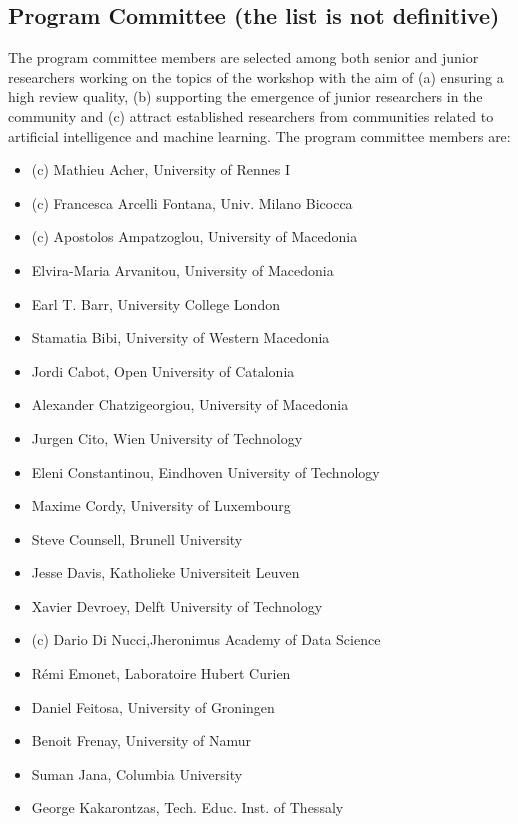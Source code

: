 \subsection{Program Committee (the list is not definitive)}
The program committee members are selected among both senior and junior researchers working on the topics of the workshop with the aim of (a) ensuring a high review quality, (b) supporting the emergence of junior researchers in the community and (c) attract established researchers from communities related to artificial intelligence and machine learning.
The program committee members are:
\begin{itemize}
	\item (c) Mathieu Acher, University of Rennes I
	\item (c) Francesca Arcelli Fontana, Univ. Milano Bicocca
	\item (c) Apostolos Ampatzoglou, University of Macedonia
	\item Elvira-Maria Arvanitou, University of Macedonia
	\item Earl T. Barr, University College London
	\item Stamatia Bibi, University of Western Macedonia
	\item Jordi Cabot, Open University of Catalonia
	\item Alexander Chatzigeorgiou, University of Macedonia
	\item Jurgen Cito, Wien University of Technology
	\item Eleni Constantinou, Eindhoven University of Technology 
	\item Maxime Cordy, University of Luxembourg
	\item Steve Counsell, Brunell University
	\item Jesse Davis, Katholieke Universiteit Leuven
	\item Xavier Devroey, Delft University of Technology
	\item (c) Dario Di Nucci,Jheronimus Academy of Data Science
	\item Rémi Emonet, Laboratoire Hubert Curien
	\item Daniel Feitosa, University of Groningen
	\item Benoit Frenay, University of Namur
	\item Suman Jana, Columbia University
	\item George Kakarontzas, Tech. Educ. Inst. of Thessaly

\end{itemize}
